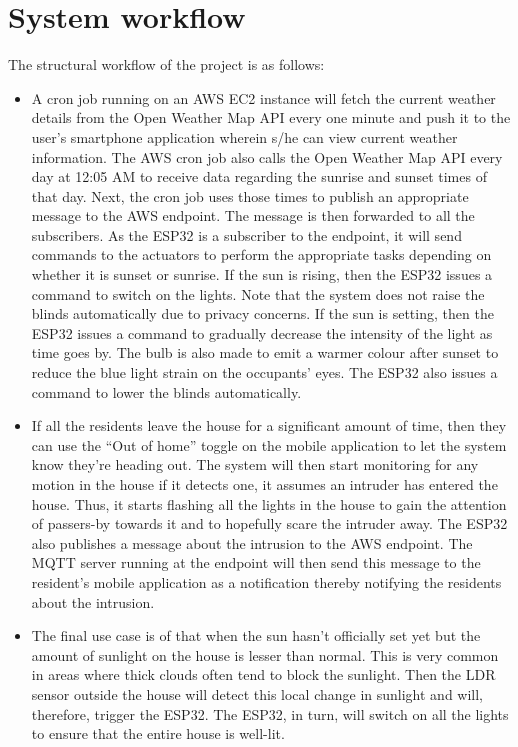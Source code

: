 \documentclass[conference]{IEEEtran}
\begin{document}
\section{System workflow}

The structural workflow of the project is as follows:

\begin{itemize}

\item A cron job running on an AWS EC2 instance will fetch the current weather details from the Open Weather Map API every one minute and push it to the user’s smartphone application wherein s/he can view current weather information. The AWS cron job also calls the Open Weather Map API every day at 12:05 AM to receive data regarding the sunrise and sunset times of that day. Next, the cron job uses those times to publish an appropriate message to the AWS endpoint. The message is then forwarded to all the subscribers. As the ESP32 is a subscriber to the endpoint, it will send commands to the actuators to perform the appropriate tasks depending on whether it is sunset or sunrise. If the sun is rising, then the ESP32 issues a command to switch on the lights. Note that the system does not raise the blinds automatically due to privacy concerns. If the sun is setting, then the ESP32 issues a command to gradually decrease the intensity of the light as time goes by. The bulb is also made to emit a warmer colour after sunset to reduce the blue light strain on the occupants’ eyes. The ESP32 also issues a command to lower the blinds automatically. 

\item If all the residents leave the house for a significant amount of time, then they can use the “Out of home” toggle on the mobile application to let the system know they’re heading out. The system will then start monitoring for any motion in the house if it detects one, it assumes an intruder has entered the house. Thus, it starts flashing all the lights in the house to gain the attention of passers-by towards it and to hopefully scare the intruder away. The ESP32 also publishes a message about the intrusion to the AWS endpoint. The MQTT server running at the endpoint will then send this message to the resident’s mobile application as a notification thereby notifying the residents about the intrusion.

\item The final use case is of that when the sun hasn’t officially set yet but the amount of sunlight on the house is lesser than normal. This is very common in areas where thick clouds often tend to block the sunlight. Then the LDR sensor outside the house will detect this local change in sunlight and will, therefore, trigger the ESP32. The ESP32, in turn, will switch on all the lights to ensure that the entire house is well-lit.

\end{itemize}
\end{document}
